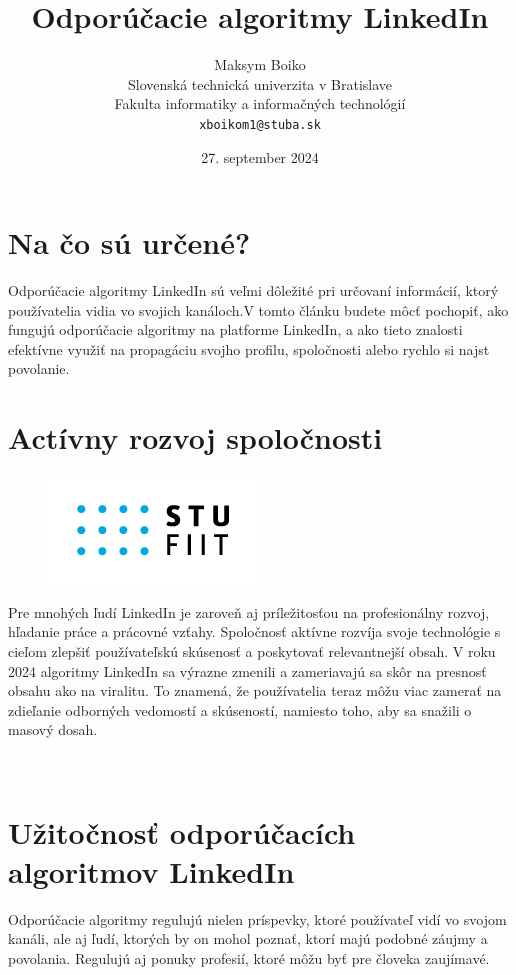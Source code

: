 \documentclass[twoside,slovak,a4paper]{coursepaper}
\title{Odporúčacie algoritmy LinkedIn\centering}
\author{Maksym Boiko\\[2pt]
{ Slovenská technická univerzita v Bratislave}\\
{ Fakulta informatiky a informačných technológií}\\
{ \texttt{xboikom1@stuba.sk}}
}
\date{\small 27. september 2024}
\begin{document}
\maketitle

\section{Na čo sú určené?}
Odporúčacie algoritmy LinkedIn sú veľmi dôležité pri určovaní informácií, ktorý používatelia vidia vo svojich kanáloch.V tomto článku budete môcť pochopiť, ako fungujú odporúčacie algoritmy na platforme LinkedIn, a ako tieto znalosti efektívne využiť na propagáciu svojho profilu, spoločnosti alebo rychlo si najst povolanie.

\section{Actívny rozvoj spoločnosti} \label{rozvoj spoločnosti}

\begin{figure}
	\includegraphics{STU-FIIT-zfv.png}
\end{figure}

Pre mnohých ľudí LinkedIn je zaroveň aj príležitosťou na profesionálny rozvoj, hľadanie práce a prácovné vzťahy.
Spoločnosť aktívne rozvíja svoje technológie s cieľom zlepšiť používateľskú skúsenosť a poskytovať relevantnejší obsah. V roku 2024 algoritmy LinkedIn sa výrazne zmenili a zameriavajú sa skôr na presnosť obsahu ako na viralitu. To znamená, že používatelia teraz môžu viac zamerať na zdieľanie odborných vedomostí a skúseností, namiesto toho, aby sa snažili o masový dosah.

~\cite{Oladipo:article}

\section{Užitočnosť odporúčacích algoritmov LinkedIn} \label{ina}
Odporúčacie algoritmy regulujú nielen príspevky, ktoré používateľ vidí vo svojom kanáli, ale aj ľudí, ktorých by on mohol poznať, ktorí majú podobné záujmy a povolania. Regulujú aj ponuky profesií, ktoré môžu byť pre človeka zaujímavé.
\end{document}
